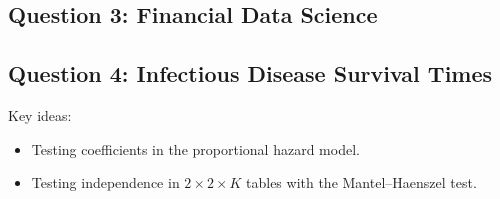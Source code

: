 \subsection*{Question 3: Financial Data Science}



\subsection*{Question 4: Infectious Disease Survival Times}
Key ideas:
\begin{itemize}
    \item Testing coefficients in the proportional hazard model.
    \item Testing independence in $2 \times 2 \times K$ tables with the Mantel--Haenszel test.
\end{itemize}
